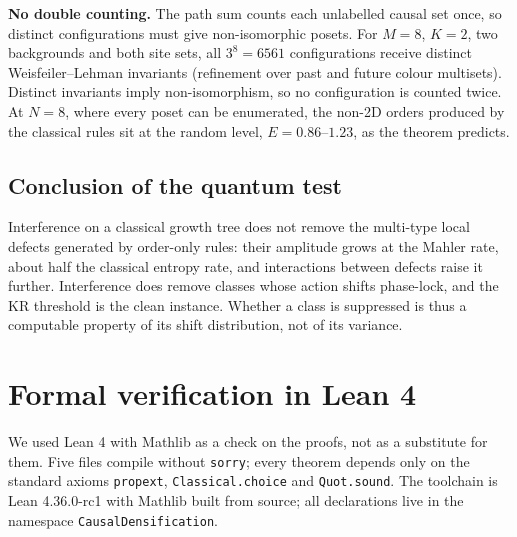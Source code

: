 \textbf{No double counting.} The path sum counts each
unlabelled causal set once, so distinct configurations must
give non-isomorphic posets. For \(M=8\), \(K=2\), two
backgrounds and both site sets, all \(3^8=6561\)
configurations receive distinct Weisfeiler--Lehman
invariants (refinement over past and future colour
multisets). Distinct invariants imply non-isomorphism, so no
configuration is counted twice. At \(N=8\), where every
poset can be enumerated, the non-2D orders produced by the
classical rules sit at the random level,
\(E=0.86\)--\(1.23\), as the theorem predicts.

\hypertarget{conclusion-of-the-quantum-test}{%
\subsection{Conclusion of the quantum
test}\label{conclusion-of-the-quantum-test}}

Interference on a classical growth tree does not remove the
multi-type local defects generated by order-only rules:
their amplitude grows at the Mahler rate, about half the
classical entropy rate, and interactions between defects
raise it further. Interference does remove classes whose
action shifts phase-lock, and the KR threshold is the clean
instance. Whether a class is suppressed is thus a computable
property of its shift distribution, not of its variance.

\hypertarget{formal-verification-in-lean-4}{%
\section{Formal verification in Lean
4}\label{formal-verification-in-lean-4}}

We used Lean 4 \cite{Lean4} with Mathlib \cite{Mathlib20}
as a check on the proofs, not as a substitute for them. Five
files compile without \texttt{sorry}; every theorem depends
only on the standard axioms \texttt{propext},
\texttt{Classical.choice} and \texttt{Quot.sound}. The
toolchain is Lean 4.36.0-rc1 with Mathlib built from source;
all declarations live in the namespace
\texttt{CausalDensification}.

